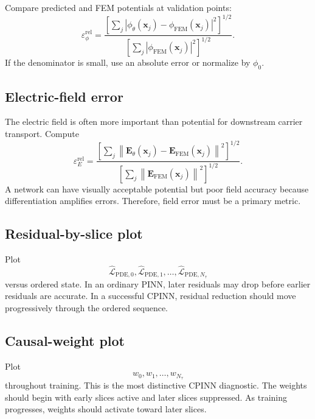 \documentclass[11pt]{article}
\newcommand{\xv}{\bm{x}}
\newcommand{\Evec}{\mathbf{E}}
\newcommand{\taud}{\tau}
\newcommand{\Norm}[1]{\left\lVert #1 \right\rVert}
\begin{document}
Compare predicted and FEM potentials at validation points:
\begin{equation}
\varepsilon_{\phi}^{\mathrm{rel}}
=\frac{\left[\sum_j\left|\phi_{\theta}(\xv_j)-\phi_{\mathrm{FEM}}(\xv_j)\right|^2\right]^{1/2}}
{\left[\sum_j\left|\phi_{\mathrm{FEM}}(\xv_j)\right|^2\right]^{1/2}}.
\label{eq:relative_potential_error}
\end{equation}
If the denominator is small, use an absolute error or normalize by $\phi_0$.

\subsection{Electric-field error}

The electric field is often more important than potential for downstream carrier transport. Compute
\begin{equation}
\varepsilon_E^{\mathrm{rel}}
=\frac{\left[\sum_j\Norm{\Evec_{\theta}(\xv_j)-\Evec_{\mathrm{FEM}}(\xv_j)}^2\right]^{1/2}}
{\left[\sum_j\Norm{\Evec_{\mathrm{FEM}}(\xv_j)}^2\right]^{1/2}}.
\label{eq:relative_field_error}
\end{equation}
A network can have visually acceptable potential but poor field accuracy because differentiation amplifies errors. Therefore, field error must be a primary metric.

\subsection{Residual-by-slice plot}

Plot
\begin{equation}
\widehat{\mathcal{L}}_{\mathrm{PDE},0},\widehat{\mathcal{L}}_{\mathrm{PDE},1},\ldots,\widehat{\mathcal{L}}_{\mathrm{PDE},N_\taud}
\end{equation}
versus ordered state. In an ordinary PINN, later residuals may drop before earlier residuals are accurate. In a successful CPINN, residual reduction should move progressively through the ordered sequence.

\subsection{Causal-weight plot}

Plot
\begin{equation}
w_0,w_1,\ldots,w_{N_\taud}
\end{equation}
throughout training. This is the most distinctive CPINN diagnostic. The weights should begin with early slices active and later slices suppressed. As training progresses, weights should activate toward later slices.
\end{document}
